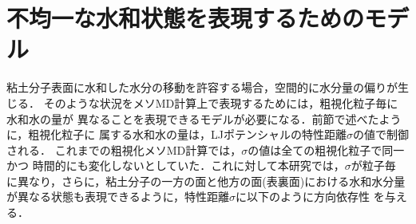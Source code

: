 ﻿\documentclass[11pt,a4j]{jarticle}
\begin{document}
\section{不均一な水和状態を表現するためのモデル}
粘土分子表面に水和した水分の移動を許容する場合，空間的に水分量の偏りが生じる．
そのような状況をメソMD計算上で表現するためには，粗視化粒子毎に水和水の量が
異なることを表現できるモデルが必要になる．前節で述べたように，粗視化粒子に
属する水和水の量は，LJポテンシャルの特性距離$\sigma$の値で制御される．
これまでの粗視化メソMD計算では，$\sigma$の値は全ての粗視化粒子で同一かつ
時間的にも変化しないとしていた．これに対して本研究では，$\sigma$が粒子毎
に異なり，さらに，粘土分子の一方の面と他方の面(表裏面)における水和水分量
が異なる状態も表現できるように，特性距離$\sigma$に以下のように方向依存性
を与える．\\
\end{document}
